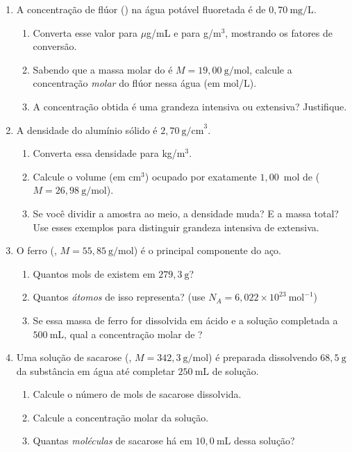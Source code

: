 \documentclass[10pt,a4paper]{article}
\begin{document}
\begin{enumerate}

\item A concentração de flúor () na água potável fluoretada é de
  $0{,}70~\text{mg/L}$.
  \begin{enumerate}
    \item Converta esse valor para $\mu$g/mL e para g/m$^3$,
          mostrando os fatores de conversão.
    \item Sabendo que a massa molar do  é
          $M = 19{,}00~\text{g/mol}$, calcule a concentração
          \emph{molar} do flúor nessa água (em mol/L).
    \item A concentração obtida é uma grandeza intensiva ou extensiva?
          Justifique.
  \end{enumerate}

\item A densidade do alumínio sólido é $2{,}70~\text{g/cm}^3$.
  \begin{enumerate}
    \item Converta essa densidade para kg/m$^3$.
    \item Calcule o volume (em cm$^3$) ocupado por exatamente
          $1{,}00$~mol de  ($M = 26{,}98~\text{g/mol}$).
    \item Se você dividir a amostra ao meio, a densidade muda?
          E a massa total? Use esses exemplos para distinguir
          grandeza intensiva de extensiva.
  \end{enumerate}

\item O ferro (, $M = 55{,}85~\text{g/mol}$) é o principal
  componente do aço.
  \begin{enumerate}
    \item Quantos mols de  existem em $279{,}3~\text{g}$?
    \item Quantos \emph{átomos} de  isso representa?
          (use $N_A = 6{,}022\times10^{23}~\text{mol}^{-1}$)
    \item Se essa massa de ferro for dissolvida em ácido e a solução
          completada a $500~\text{mL}$, qual a concentração molar
          de ?
  \end{enumerate}

\item Uma solução de sacarose (,
  $M = 342{,}3~\text{g/mol}$) é preparada dissolvendo
  $68{,}5~\text{g}$ da substância em água até completar
  $250~\text{mL}$ de solução.
  \begin{enumerate}
    \item Calcule o número de mols de sacarose dissolvida.
    \item Calcule a concentração molar da solução.
    \item Quantas \emph{moléculas} de sacarose há em $10{,}0~\text{mL}$
          dessa solução?
  \end{enumerate}


\end{enumerate}
\end{document}
